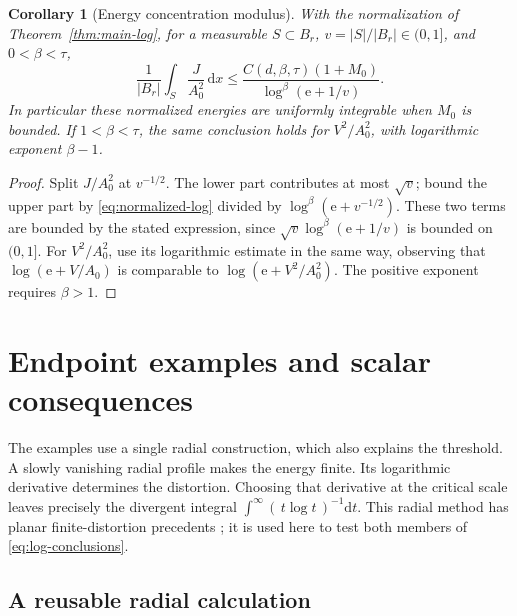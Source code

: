\documentclass[11pt,a4paper]{article}
\numberwithin{equation}{section}
\newtheorem{corollary}[theorem]{Corollary}
\theoremstyle{definition}
\theoremstyle{remark}\newtheorem{remark}[theorem]{Remark}
\newcommand{\ee}{\mathrm e}
\newcommand{\dd}{\,\mathrm dx}
\begin{document}
\begin{corollary}[Energy concentration modulus]\label{cor:energy-modulus}
With the normalization of Theorem~\ref{thm:main-log}, for a measurable
\(S\subset B_r\), \(v=|S|/|B_r|\in(0,1]\), and \(0<\beta<\tau\),
\[
 \frac1{|B_r|}\int_S\frac J{A_0^2}\dd
 \leq \frac{C(d,\beta,\tau)(1+M_0)}
                    {\log^\beta(\ee+1/v)}.
\]
In particular these normalized energies are uniformly integrable
when \(M_0\) is bounded. If \(1<\beta<\tau\), the same conclusion
holds for \(V^2/A_0^2\), with logarithmic exponent \(\beta-1\).
\end{corollary}
\begin{proof}
Split \(J/A_0^2\) at \(v^{-1/2}\). The lower part contributes at most
\(\sqrt v\); bound the upper part by \eqref{eq:normalized-log} divided
by \(\log^\beta(\ee+v^{-1/2})\).
These two terms are bounded by the stated expression, since
\(\sqrt v\log^\beta(\ee+1/v)\) is bounded on \((0,1]\).
For \(V^2/A_0^2\), use its logarithmic estimate in the same way,
observing that \(\log(\ee+V/A_0)\) is comparable to
\(\log(\ee+V^2/A_0^2)\). The positive exponent requires \(\beta>1\).
\end{proof}



\section{Endpoint examples and scalar consequences}\label{sec:examples}

The examples use a single radial construction, which also explains the
threshold. A slowly vanishing radial profile makes the energy finite.
Its logarithmic derivative determines the distortion. Choosing that
derivative at the critical scale leaves precisely the divergent integral
\(\int^\infty(\,t\log t\,)^{-1}\mathrm dt\).
This radial method has planar finite-distortion precedents
\cite{Astala2010}; it is used here to test both members of
\eqref{eq:log-conclusions}.

\subsection{A reusable radial calculation}
\end{document}
